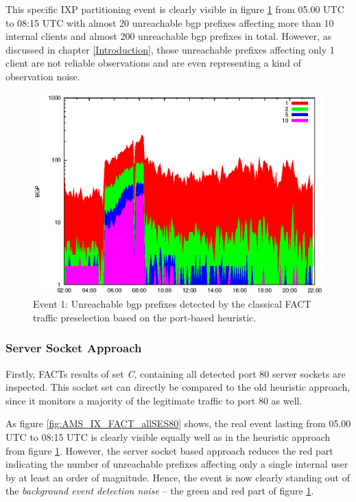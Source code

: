 This specific IXP partitioning event is clearly visible in figure 
\ref{fig:AMS_IX_FACT_REF} from 05.00 UTC to 08:15 UTC with almost 20 unreachable 
\gls{bgp} prefixes affecting more than 10 internal clients and almost 200 
unreachable \gls{bgp} prefixes in total. 
However, as discussed in chapter \ref{Introduction}, those unreachable prefixes 
affecting only 1 client are not reliable observations and are even representing 
a kind of observation noise. 
\begin{figure}
	[p] \centering 
	\includegraphics[width=0.75\linewidth]{images/events/2010_03_25/bgp_log_port80_ref.eps} \caption{Event 1: Unreachable \gls{bgp} prefixes detected by the classical \gls{FACT} traffic preselection based on the port-based heuristic.} 
	\label{fig:AMS_IX_FACT_REF} 
\end{figure}

\subsubsection{Server Socket Approach}

Firstly, \gls{FACT}s results of set \emph{C}, containing all detected port 80 
\glspl{server socket} are inspected. This socket set can directly be compared to 
the old heuristic approach, since it monitors a majority of the legitimate 
traffic to port 80 as well. 

As figure \ref{fig:AMS_IX_FACT_allSES80} shows, the real event lasting from 
05.00 UTC to 08:15 UTC is clearly visible equally well as in the heuristic 
approach from figure \ref{fig:AMS_IX_FACT_REF}. However, the \gls{server socket} 
based approach reduces the red part indicating the number of unreachable 
prefixes affecting only a single internal user by at least an order of 
magnitude. 
Hence, the event is now clearly standing out of the \emph{background event 
detection noise} -- the green and red part of figure \ref{fig:AMS_IX_FACT_REF}. 

